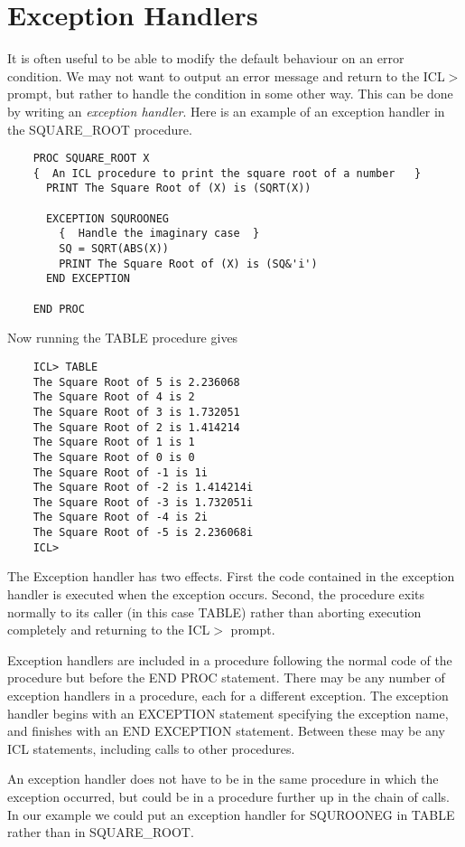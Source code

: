 \documentclass[twoside,11pt]{report}
\newcommand{\xlabel}[1]{}
\begin{document}
\section{\xlabel{exception_handlers}Exception Handlers}

It is often useful to be able to modify the default behaviour on an
error condition. We may not want to output an error message and return
to the ICL$>$ prompt, but rather to handle the condition in some other way.
This can be done by writing an {\em exception handler}. Here is an
example of an exception handler in the SQUARE\_ROOT procedure.

\begin{verbatim}
    PROC SQUARE_ROOT X
    {  An ICL procedure to print the square root of a number   }
      PRINT The Square Root of (X) is (SQRT(X))

      EXCEPTION SQUROONEG
        {  Handle the imaginary case  }
        SQ = SQRT(ABS(X))
        PRINT The Square Root of (X) is (SQ&'i')
      END EXCEPTION

    END PROC
\end{verbatim}

Now running the TABLE procedure gives

\begin{verbatim}
    ICL> TABLE
    The Square Root of 5 is 2.236068
    The Square Root of 4 is 2
    The Square Root of 3 is 1.732051
    The Square Root of 2 is 1.414214
    The Square Root of 1 is 1
    The Square Root of 0 is 0
    The Square Root of -1 is 1i
    The Square Root of -2 is 1.414214i
    The Square Root of -3 is 1.732051i
    The Square Root of -4 is 2i
    The Square Root of -5 is 2.236068i
    ICL>
\end{verbatim}
The Exception handler has two effects. First the code contained in the 
exception handler is executed when the exception occurs. Second, the procedure
exits normally to its caller (in this case TABLE) rather than aborting
execution completely and returning to the ICL$>$ prompt.

Exception handlers are included in a procedure following the normal code
of the procedure but before the END PROC statement. There may be any number
of exception handlers in a procedure, each for a different exception.
The exception handler begins with an EXCEPTION statement specifying the
exception name, and finishes with an END EXCEPTION statement. Between
these may be any ICL statements, including calls to other procedures.

An exception handler does not have to be in the same procedure in which the
exception occurred, but could be in a procedure further up in the chain of 
calls. In our example we could put an exception handler for SQUROONEG in
TABLE rather than in SQUARE\_ROOT.
\end{document}
